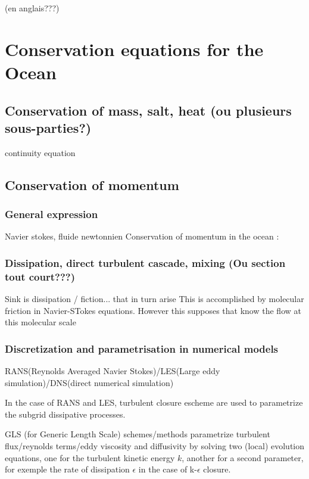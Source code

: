 \hypersetup{pdfborder=0 0 0}

(en anglais???)

\section{Conservation equations for the Ocean}

\subsection{Conservation of mass, salt, heat (ou plusieurs sous-parties?)}

continuity equation

\subsection{Conservation of momentum}

\subsubsection{General expression}
Navier stokes, fluide newtonnien
Conservation of momentum in the ocean :




\subsubsection{Dissipation, direct turbulent cascade, mixing (Ou section tout court???)}
Sink is dissipation / fiction...  that in turn arise 
This is accomplished by molecular friction in Navier-STokes equations. However this supposes that know the flow at this molecular scale

\subsubsection{Discretization and parametrisation in numerical models}

RANS(Reynolds Averaged Navier Stokes)/LES(Large eddy simulation)/DNS(direct numerical simulation)

In the case of RANS and LES, turbulent closure escheme are used to parametrize the subgrid dissipative processes.

GLS (for Generic Length Scale) schemes/methods parametrize turbulent flux/reynolds terms/eddy viscosity and diffusivity by solving two (local) evolution equations, one for the turbulent kinetic energy $k$, another for a second parameter, for exemple the rate of dissipation $\epsilon$ in the case of k-$\epsilon$ closure.

